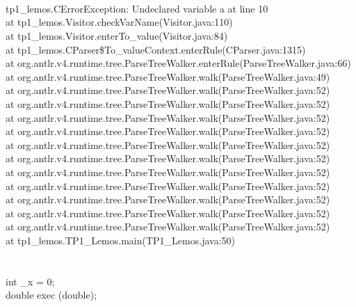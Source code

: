 \documentclass[tikz,border=10pt]{standalone}
\begin{document}
\phantom \\
\phantom \\
\phantom \\
tp1\_lemos.CErrorException: Undeclared variable a at line 10 \\
\indent at tp1\_lemos.Visitor.checkVarName(Visitor.java:110) \\
\indent	at tp1\_lemos.Visitor.enterTo\_value(Visitor.java:84) \\
\indent	at tp1\_lemos.CParser\$To\_valueContext.enterRule(CParser.java:1315) \\
\indent	at org.antlr.v4.runtime.tree.ParseTreeWalker.enterRule(ParseTreeWalker.java:66) \\
\indent	at org.antlr.v4.runtime.tree.ParseTreeWalker.walk(ParseTreeWalker.java:49) \\
\indent	at org.antlr.v4.runtime.tree.ParseTreeWalker.walk(ParseTreeWalker.java:52) \\
\indent	at org.antlr.v4.runtime.tree.ParseTreeWalker.walk(ParseTreeWalker.java:52) \\
\indent	at org.antlr.v4.runtime.tree.ParseTreeWalker.walk(ParseTreeWalker.java:52) \\
\indent	at org.antlr.v4.runtime.tree.ParseTreeWalker.walk(ParseTreeWalker.java:52)\\
\indent	at org.antlr.v4.runtime.tree.ParseTreeWalker.walk(ParseTreeWalker.java:52)\\ 
\indent	at org.antlr.v4.runtime.tree.ParseTreeWalker.walk(ParseTreeWalker.java:52)\\
\indent	at org.antlr.v4.runtime.tree.ParseTreeWalker.walk(ParseTreeWalker.java:52)\\
\indent	at org.antlr.v4.runtime.tree.ParseTreeWalker.walk(ParseTreeWalker.java:52)\\
\indent	at org.antlr.v4.runtime.tree.ParseTreeWalker.walk(ParseTreeWalker.java:52)\\
\indent	at org.antlr.v4.runtime.tree.ParseTreeWalker.walk(ParseTreeWalker.java:52)\\
\indent	at org.antlr.v4.runtime.tree.ParseTreeWalker.walk(ParseTreeWalker.java:52)\\
\indent	at tp1\_lemos.TP1\_Lemos.main(TP1\_Lemos.java:50)\\

\\
\\

int \_x = 0;\\

double exec (double);\\
\end{document}
